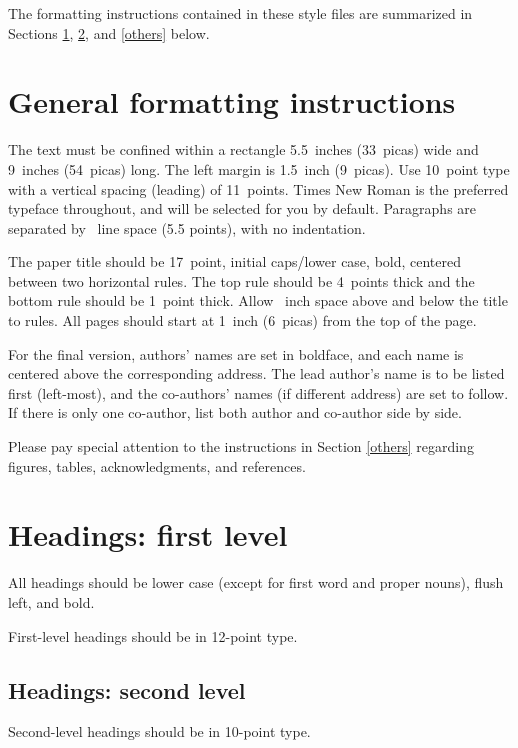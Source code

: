 \documentclass{article}
\begin{document}
The formatting instructions contained in these style files are summarized in
Sections \ref{gen_inst}, \ref{headings}, and \ref{others} below.



\section{General formatting instructions}
\label{gen_inst}


The text must be confined within a rectangle 5.5~inches (33~picas) wide and
9~inches (54~picas) long. The left margin is 1.5~inch (9~picas).  Use 10~point
type with a vertical spacing (leading) of 11~points.  Times New Roman is the
preferred typeface throughout, and will be selected for you by default.
Paragraphs are separated by ~line space (5.5 points), with no
indentation.


The paper title should be 17~point, initial caps/lower case, bold, centered
between two horizontal rules. The top rule should be 4~points thick and the
bottom rule should be 1~point thick. Allow ~inch space above and
below the title to rules. All pages should start at 1~inch (6~picas) from the
top of the page.


For the final version, authors' names are set in boldface, and each name is
centered above the corresponding address. The lead author's name is to be listed
first (left-most), and the co-authors' names (if different address) are set to
follow. If there is only one co-author, list both author and co-author side by
side.


Please pay special attention to the instructions in Section \ref{others}
regarding figures, tables, acknowledgments, and references.


\section{Headings: first level}
\label{headings}


All headings should be lower case (except for first word and proper nouns),
flush left, and bold.


First-level headings should be in 12-point type.


\subsection{Headings: second level}


Second-level headings should be in 10-point type.
\end{document}
